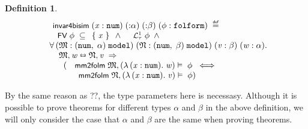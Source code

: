 \documentclass{llncs}
\newtheorem{defn}{Definition}[chapter]
\newenvironment{holmath}{\begin{displaymath}\begin{array}{l}}{\end{array}\end{displaymath}\ignorespacesafterend}
\renewcommand{\HOLConst}[1]{{\textsf{\upshape\small #1}}}
\begin{document}
\begin{defn}
{\upshape\cite[Definition 2.67 (Invariant for Bisimulations)]{Blackburn}}
\begin{holmath}
  \HOLConst{invar4bisim}\;(\HOLFreeVar{x} :\HOLTyOp{num})\;({:}\ensuremath{\alpha})\;({:}\ensuremath{\beta})\;(\HOLFreeVar{\ensuremath{\phi}} :\HOLTyOp{folform})\;\HOLTokenDefEquality{}\\
\;\;\HOLConst{FV}\;\HOLFreeVar{\ensuremath{\phi}}\;\HOLSymConst{\HOLTokenSubset{}}\;\HOLTokenLeftbrace{}\HOLFreeVar{x}\HOLTokenRightbrace{}\;\HOLSymConst{\HOLTokenConj{}}\;\HOLConst{\ensuremath{{\mathcal L}^1_\tau}}\;\HOLFreeVar{\ensuremath{\phi}}\;\HOLSymConst{\HOLTokenConj{}}\\
\;\;\HOLSymConst{\HOLTokenForall{}}(\HOLBoundVar{\ensuremath{\mathfrak{M}}} :(\HOLTyOp{num},\;\ensuremath{\alpha})\;\HOLTyOp{model})\;(\HOLBoundVar{\ensuremath{\mathfrak{N}}} :(\HOLTyOp{num},\;\ensuremath{\beta})\;\HOLTyOp{model})\;(\HOLBoundVar{v} :\ensuremath{\beta})\;(\HOLBoundVar{w} :\ensuremath{\alpha}).\\
\;\;\;\;\;\;\HOLBoundVar{\ensuremath{\mathfrak{M}}}\HOLSymConst{,}\HOLBoundVar{w}\HOLSymConst{\ensuremath{\leftrightarroweq}}\HOLBoundVar{\ensuremath{\mathfrak{N}}}\HOLSymConst{,}\HOLBoundVar{v}\;\HOLSymConst{\HOLTokenImp{}}\\
\;\;\;\;\;\;\;\;(\HOLConst{mm2folm}\;\HOLBoundVar{\ensuremath{\mathfrak{M}}},(\HOLTokenLambda{}(\HOLBoundVar{x} :\HOLTyOp{num}).\;\HOLBoundVar{w})\ensuremath{\vDash}\;\HOLFreeVar{\ensuremath{\phi}}\;\HOLSymConst{\HOLTokenEquiv{}}\\
\;\;\;\;\;\;\;\;\;\;\;\HOLConst{mm2folm}\;\HOLBoundVar{\ensuremath{\mathfrak{N}}},(\HOLTokenLambda{}(\HOLBoundVar{x} :\HOLTyOp{num}).\;\HOLBoundVar{v})\ensuremath{\vDash}\;\HOLFreeVar{\ensuremath{\phi}})
\end{holmath}
\end{defn}

By the same reason as ??, the type parameters here is necessasy. Although it is possible to prove theorems for different types $\alpha$ and $\beta$ in the above definition, we will only consider the case that $\alpha$ and $\beta$ are the same when proving theorems. 
\end{document}
